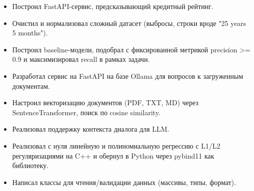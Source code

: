 \documentclass[10pt,a4paper,ragged2e]{altacv}
\begin{document}
{\Large{}}
\begin{itemize}\large
\item Построил FastAPI-сервис, предсказывающий кредитный рейтинг.
\item Очистил и нормализовал сложный датасет (выбросы, строки вроде "25 years 5 months").
\item Построил baseline-модели, подобрал с \newline фиксированной метрикой precision >= 0.9 и максимизировал recall в рамках задачи.
\end{itemize}
\smallskip
\divider
\smallskip

{\Large{}}
\begin{itemize}\large
\item Разработал сервис на FastAPI на базе Ollama для вопросов к загруженным документам.
\item Настроил векторизацию документов (PDF, TXT, MD) через SentenceTransformer, поиск по cosine similarity.
\item Реализовал поддержку контекста диалога для LLM.
\end{itemize}

\smallskip
\divider
\smallskip

{\Large{}}
\begin{itemize}\large
    \item Реализовал с нуля линейную и полиномиальную регрессию с L1/L2 регуляризациями на C++ и обернул в Python через pybind11 как библиотеку.
    \item Написал классы для чтения/валидации данных (массивы, типы, формат).
\end{itemize}


\smallskip
\smallskip




\end{document}
